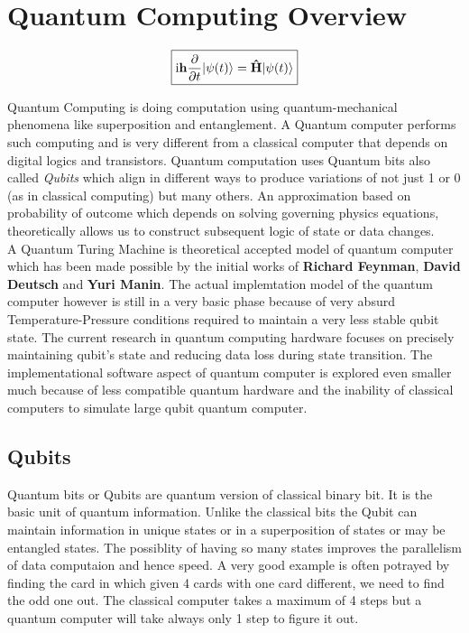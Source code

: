 \chapter{Quantum Computing Overview }
\graphicspath{ {./images/} }

\[ \boxed {\mbox{i\textbf{h}}\dfrac{\partial}{\partial t}|\psi(t)\rangle = \bm{\hat{\textnormal{\bfseries H}}} |\psi(t)\rangle }
\]

Quantum Computing \cite{QCQI} is doing computation using quantum-mechanical phenomena like superposition and entanglement. A Quantum computer performs such computing and is very different from a classical computer that depends on digital logics and transistors. Quantum computation uses Quantum bits also called \textit{Qubits} which align in different ways to produce variations of not just 1 or 0 (as in classical computing) but many others. An approximation based on probability of outcome which depends on solving governing physics equations, theoretically allows us to construct subsequent logic of state or data changes.\\

A Quantum Turing Machine is theoretical accepted model of quantum computer which has been made possible by the initial works of \textbf{Richard Feynman}, \textbf{David Deutsch}  and \textbf{Yuri Manin}. The actual implemtation model of the quantum computer however is still in a very basic phase because of very absurd Temperature-Pressure conditions required to maintain a very less stable qubit state. The current research in quantum computing hardware focuses on precisely maintaining qubit's state and reducing data loss during state transition. The implementational software aspect of quantum computer is explored even smaller much because of less compatible quantum hardware and the inability of classical computers to simulate large qubit quantum computer.\\

\section{Qubits}
Quantum bits or Qubits are quantum version of classical binary bit. It is the basic unit of quantum information. Unlike the classical bits the Qubit can maintain information in unique states or in a superposition of states or may be  entangled states. The possiblity of having so many states improves the parallelism of data computaion and hence speed. A very good example is often potrayed by finding the card in which given 4 cards with one card different, we need to find the odd one out. The classical computer takes a maximum of 4 steps but a quantum computer will take always only 1 step to figure it out. 

